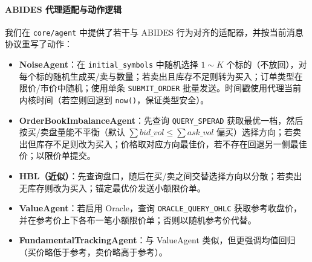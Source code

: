 \paragraph{ABIDES 代理适配与动作逻辑}
我们在 \verb|core/agent| 中提供了若干与 ABIDES 行为对齐的适配器，并按当前消息协议重写了动作：
\begin{itemize}
  \item \textbf{NoiseAgent}：在 \verb|initial_symbols| 中随机选择 $1\sim K$ 个标的（不放回），对每个标的随机生成买/卖与数量；若卖出且库存不足则转为买入；订单类型在限价/市价中随机；使用单条 \verb|SUBMIT_ORDER| 批量发送。时间戳使用代理当前内核时间（若空则回退到 \verb|now()|，保证类型安全）。
  \item \textbf{OrderBookImbalanceAgent}：先查询 \verb|QUERY_SPERAD| 获取最优一档，然后按买/卖盘量能不平衡（默认 $\sum bid\_vol \le \sum ask\_vol$ 偏买）选择方向；若卖出但库存不足则改为买入；价格取对应方向最佳价，若不存在回退另一侧最佳价；以限价单提交。
  \item \textbf{HBL（近似）}：先查询盘口，随后在买/卖之间交替选择方向以分散；若卖出无库存则改为买入；锚定最优价发送小额限价单。
  \item \textbf{ValueAgent}：若启用 Oracle，查询 \verb|ORACLE_QUERY_OHLC| 获取参考收盘价，并在参考价上下各布一笔小额限价单；否则以随机参考价代替。
  \item \textbf{FundamentalTrackingAgent}：与 ValueAgent 类似，但更强调均值回归（买价略低于参考，卖价略高于参考）。
\end{itemize}

